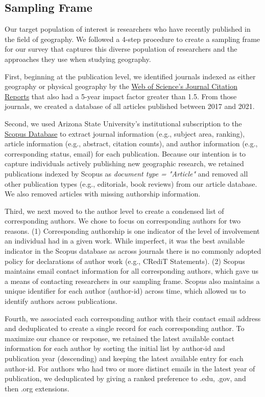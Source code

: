\documentclass[]{interact}
\theoremstyle{plain}%
\theoremstyle{definition}
\theoremstyle{remark}
\begin{document}
\subsection*{Sampling Frame}
Our target population of interest is researchers who have recently published in the field of geography. 
We followed a 4-step procedure to create a sampling frame for our survey that captures this diverse population of researchers and the approaches they use when studying geography. 

First, beginning at the publication level, we identified journals indexed as either geography or physical geography by the \href{https://access.clarivate.com/}{Web of Science's Journal Citation Reports} that also had a 5-year impact factor greater than 1.5.
From those journals, we created a database of all articles published between 2017 and 2021.  

Second, we used Arizona State University's institutional subscription to the \href{https://www.scopus.com/home.uri}{Scopus Database} to extract journal information (e.g., subject area, ranking), article information (e.g., abstract, citation counts), and author information (e.g., corresponding status, email) for each publication. 
Because our intention is to capture individuals actively publishing new geographic research, we retained publications indexed by Scopus as \textit{document type = "Article"} and removed all other publication types (e.g., editorials, book reviews) from our article database. 
We also removed articles with missing authorship information. 

Third, we next moved to the author level to create a condensed list of corresponding authors. 
We chose to focus on corresponding authors for two reasons. 
(1) Corresponding authorship is one indicator of the level of involvement an individual had in a given work. 
While imperfect, it was the best available indicator in the Scopus database as across journals there is no commonly adopted policy for declarations of author work (e.g., CRediT Statements).
(2) Scopus maintains email contact information for all corresponding authors, which gave us a means of contacting researchers in our sampling frame.
Scopus also maintains a unique identifier for each author (author-id) across time, which allowed us to identify authors across publications. 

Fourth, we associated each corresponding author with their contact email address and deduplicated to create a single record for each corresponding author. 
To maximize our chance or response, we retained the latest available contact information for each author by sorting the initial list by author-id and publication year (descending) and keeping the latest available entry for each author-id. 
For authors who had two or more distinct emails in the latest year of publication, we deduplicated by giving a ranked preference to .edu, .gov, and then .org extensions.
\end{document}
